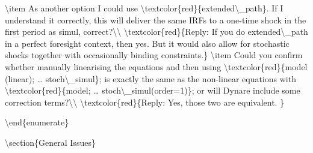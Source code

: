 \documentclass[10pt,math=newtx,citestyle=gb7714-2015,bibstyle=gb7714-2015]{elegantbook}
\begin{document}
	\textbackslash{}item As another option I could use \textbackslash{}textcolor\{red\}\{extended\textbackslash{}\_path\}. If I understand it correctly, this will deliver the same IRFs to a one-time shock in the first period as simul, correct?\textbackslash{}\textbackslash{}
	\textbackslash{}textcolor\{red\}\{Reply: If you do extended\textbackslash{}\_path in a perfect foresight context, then yes. But it would also allow for stochastic shocks together with occasionally binding constraints.\}
	\textbackslash{}item Could you confirm whether manually linearising the equations and then using \textbackslash{}textcolor\{red\}\{model (linear); … stoch\textbackslash{}\_simul\}; is exactly the same as the non-linear equations with \textbackslash{}textcolor\{red\}\{model; … stoch\textbackslash{}\_simul(order=1)\}; or will Dynare include some correction terms?\textbackslash{}\textbackslash{}
	\textbackslash{}textcolor\{red\}\{Reply:
	Yes, those two are equivalent.
	\}
	
	\textbackslash{}end\{enumerate\}
	
	\textbackslash{}section\{General Issues\}
	
\end{document}
